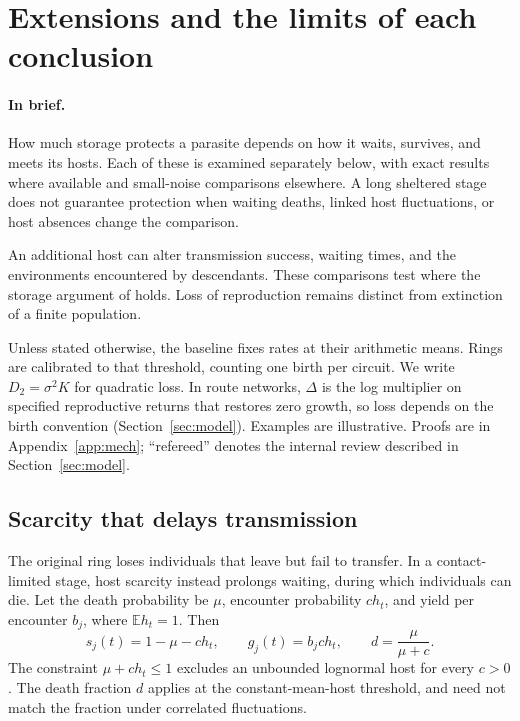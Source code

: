 \section{Extensions and the limits of each conclusion}\label{sec:mech}

\paragraph{In brief.}
How much storage protects a parasite depends on how it waits, survives, and meets its hosts. Each of these is examined separately below, with exact results where available and small-noise comparisons elsewhere. A long sheltered stage does not guarantee protection when waiting deaths, linked host fluctuations, or host absences change the comparison.

An additional host can alter transmission success, waiting times, and the environments encountered by descendants. These comparisons test where the storage argument of \citet{dobson2020} holds. Loss of reproduction remains distinct from extinction of a finite population.

Unless stated otherwise, the baseline fixes rates at their arithmetic means. Rings are calibrated to that threshold, counting one birth per circuit. We write \(D_2=\sigma^2K\) for quadratic loss. In route networks, \(\Delta\) is the log multiplier on specified reproductive returns that restores zero growth, so loss depends on the birth convention (Section~\ref{sec:model}). Examples are illustrative. Proofs are in Appendix~\ref{app:mech}; ``refereed'' denotes the internal review described in Section~\ref{sec:model}.

\subsection{Scarcity that delays transmission}
The original ring loses individuals that leave but fail to transfer. In a contact-limited stage, host scarcity instead prolongs waiting, during which individuals can die. Let the death probability be \(\mu\), encounter probability \(ch_t\), and yield per encounter \(b_j\), where \(\mathbb E h_t=1\). Then
\begin{equation}\label{eq:mech-contact-model}
 s_j(t)=1-\mu-ch_t,\qquad g_j(t)=b_jch_t,
 \qquad d=\frac{\mu}{\mu+c}.
\end{equation}
The constraint \(\mu+ch_t\leq1\) excludes an unbounded lognormal host for every \(c>0\). The death fraction \(d\) applies at the constant-mean-host threshold, and need not match the fraction under correlated fluctuations.

